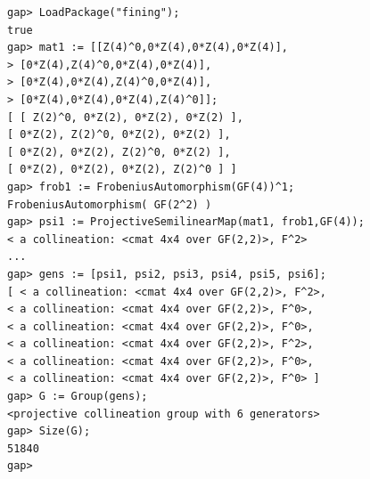 \begin{verbatim}
gap> LoadPackage("fining");
true
gap> mat1 := [[Z(4)^0,0*Z(4),0*Z(4),0*Z(4)],
> [0*Z(4),Z(4)^0,0*Z(4),0*Z(4)],
> [0*Z(4),0*Z(4),Z(4)^0,0*Z(4)],
> [0*Z(4),0*Z(4),0*Z(4),Z(4)^0]];
[ [ Z(2)^0, 0*Z(2), 0*Z(2), 0*Z(2) ], 
[ 0*Z(2), Z(2)^0, 0*Z(2), 0*Z(2) ], 
[ 0*Z(2), 0*Z(2), Z(2)^0, 0*Z(2) ], 
[ 0*Z(2), 0*Z(2), 0*Z(2), Z(2)^0 ] ]
gap> frob1 := FrobeniusAutomorphism(GF(4))^1;
FrobeniusAutomorphism( GF(2^2) )
gap> psi1 := ProjectiveSemilinearMap(mat1, frob1,GF(4));
< a collineation: <cmat 4x4 over GF(2,2)>, F^2>
...
gap> gens := [psi1, psi2, psi3, psi4, psi5, psi6];
[ < a collineation: <cmat 4x4 over GF(2,2)>, F^2>, 
< a collineation: <cmat 4x4 over GF(2,2)>, F^0>, 
< a collineation: <cmat 4x4 over GF(2,2)>, F^0>, 
< a collineation: <cmat 4x4 over GF(2,2)>, F^2>, 
< a collineation: <cmat 4x4 over GF(2,2)>, F^0>, 
< a collineation: <cmat 4x4 over GF(2,2)>, F^0> ]
gap> G := Group(gens);
<projective collineation group with 6 generators>
gap> Size(G);
51840
gap> 
\end{verbatim}
